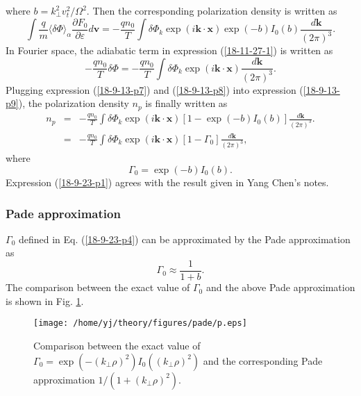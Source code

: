 \documentclass{article}
\begin{document}
where $b = k_{\perp}^2 v_t^2 / \Omega^2$. Then the corresponding polarization
density is written as
\begin{equation}
  \int \frac{q}{m} \langle \delta \Phi \rangle_{\alpha} \frac{\partial
  F_0}{\partial \varepsilon} d\mathbf{v}= - \frac{q n_0}{T}  \int \delta
  \Phi_k \exp (i\mathbf{k} \cdot \mathbf{x}) \exp (- b) I_0 (b)
  \frac{d\mathbf{k}}{(2 \pi)^3} .
\end{equation}
In Fourier space, the adiabatic term in expression (\ref{18-11-27-1}) is
written as
\begin{equation}
  \label{18-9-13-p8} - \frac{q n_0}{T} \delta \Phi = - \frac{q n_0}{T}  \int
  \delta \Phi_k \exp (i\mathbf{k} \cdot \mathbf{x}) \frac{d\mathbf{k}}{(2
  \pi)^3} .
\end{equation}
Plugging expression (\ref{18-9-13-p7}) and (\ref{18-9-13-p8}) into expression
(\ref{18-9-13-p9}), the polarization density $n_p$ is finally written as
\begin{eqnarray}
  n_p & = & - \frac{q n_0}{T} \int \delta \Phi_k \exp (i\mathbf{k} \cdot
  \mathbf{x}) [1 - \exp (- b) I_0 (b)] \frac{d\mathbf{k}}{(2 \pi)^3} . \\
  & = & - \frac{q n_0}{T} \int \delta \Phi_k \exp (i\mathbf{k} \cdot
  \mathbf{x}) [1 - \Gamma_0] \frac{d\mathbf{k}}{(2 \pi)^3}, 
  \label{18-9-23-p1}
\end{eqnarray}
where
\begin{equation}
  \label{18-9-23-p4} \Gamma_0 = \exp (- b) I_0 (b) .
\end{equation}
Expression (\ref{18-9-23-p1}) agrees with the result given in Yang Chen's
notes.

\subsubsection{Pade approximation}

$\Gamma_0$ defined in Eq. (\ref{18-9-23-p4}) can be approximated by the Pade
approximation as
\begin{equation}
  \label{18-10-23-p1} \Gamma_0 \approx \frac{1}{1 + b} .
\end{equation}
The comparison between the exact value of $\Gamma_0$ and the above Pade
approximation is shown in Fig. \ref{18-9-23-e1}.

\begin{figure}[h]
  \texttt{[image: /home/yj/theory/figures/pade/p.eps]}
  \caption{\label{18-9-23-e1}Comparison between the exact value of $\Gamma_0 =
  \exp (- (k_{\perp} \rho)^2) I_0 ((k_{\perp} \rho)^2)$ and the corresponding
  Pade approximation $1 / (1 + (k_{\perp} \rho)^2)$.}
\end{figure}
\end{document}
